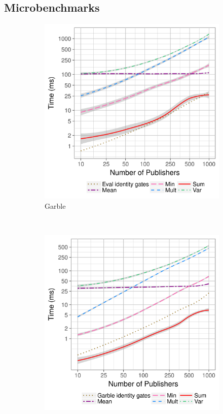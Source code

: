 \subsection{Microbenchmarks}

\begin{figure}[ht]
    \centering
    \begin{subfigure}[b]{0.32\textwidth}
        \includegraphics[width=\textwidth]{plots/garble_loglog.png}
        \caption{Garble}
        \label{fig:micro-garble-time}
    \end{subfigure}
    ~ %
    \begin{subfigure}[b]{0.32\textwidth}
        \includegraphics[width=\textwidth]{plots/eval_loglog.png}

\end{subfigure}
\end{figure}

